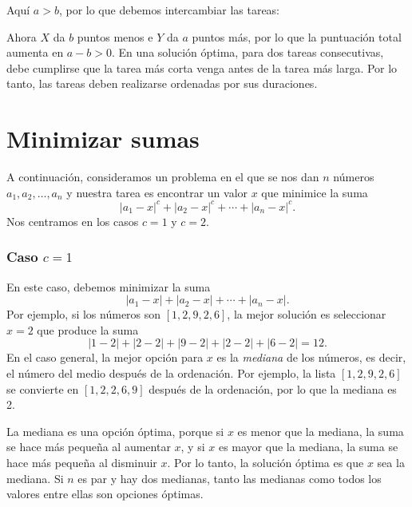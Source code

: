 Aquí $a>b$, por lo que debemos intercambiar las tareas:
\begin{center}
\end{center}
Ahora $X$ da $b$ puntos menos e $Y$ da $a$ puntos más,
por lo que la puntuación total aumenta en $a-b > 0$.
En una solución óptima,
para dos tareas consecutivas,
debe cumplirse que la tarea más corta venga
antes de la tarea más larga.
Por lo tanto, las tareas deben realizarse
ordenadas por sus duraciones.

\section{Minimizar sumas}

A continuación, consideramos un problema en el que
se nos dan $n$ números $a_1,a_2,\ldots,a_n$
y nuestra tarea es encontrar un valor $x$
que minimice la suma
\[|a_1-x|^c+|a_2-x|^c+\cdots+|a_n-x|^c.\]
Nos centramos en los casos $c=1$ y $c=2$.

\subsubsection{Caso $c=1$}

En este caso, debemos minimizar la suma
\[|a_1-x|+|a_2-x|+\cdots+|a_n-x|.\]
Por ejemplo, si los números son $[1,2,9,2,6]$,
la mejor solución es seleccionar $x=2$
que produce la suma
\[
|1-2|+|2-2|+|9-2|+|2-2|+|6-2|=12.
\]
En el caso general, la mejor opción para $x$
es la \textit{mediana} de los números,
es decir, el número del medio después de la ordenación.
Por ejemplo, la lista $[1,2,9,2,6]$
se convierte en $[1,2,2,6,9]$ después de la ordenación,
por lo que la mediana es 2.

La mediana es una opción óptima,
porque si $x$ es menor que la mediana,
la suma se hace más pequeña al aumentar $x$,
y si $x$ es mayor que la mediana,
la suma se hace más pequeña al disminuir $x$.
Por lo tanto, la solución óptima es que $x$
sea la mediana.
Si $n$ es par y hay dos medianas,
tanto las medianas como todos los valores entre ellas
son opciones óptimas.

